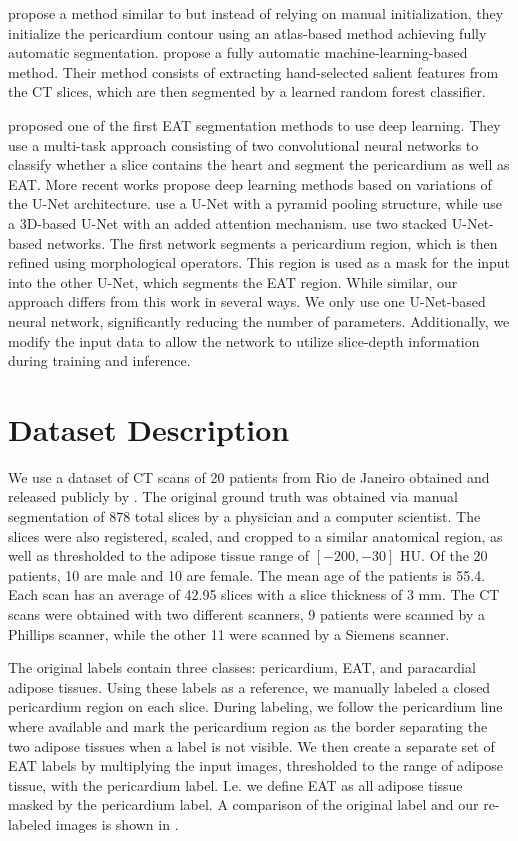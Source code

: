 \citet{Ding2014} propose a method similar to \citet{Coppini2010} but instead of relying on manual initialization, they initialize the pericardium contour using an atlas-based method achieving fully automatic segmentation. \citet{Rodrigues2016} propose a fully automatic machine-learning-based method. Their method consists of extracting hand-selected salient features from the CT slices, which are then segmented by a learned random forest classifier.

\citet{Commandeur2018} proposed one of the first EAT segmentation methods to use deep learning. They use a multi-task approach consisting of two convolutional neural networks to classify whether a slice contains the heart and segment the pericardium as well as EAT. More recent works propose deep learning methods based on variations of the U-Net architecture. \citet{Li2019} use a U-Net with a pyramid pooling structure, while \citet{he2020} use a 3D-based U-Net with an added attention mechanism. \citet{Zhang2020} use two stacked U-Net-based networks. The first network segments a pericardium region, which is then refined using morphological operators. This region is used as a mask for the input into the other U-Net, which segments the EAT region. While similar, our approach differs from this work in several ways. We only use one U-Net-based neural network, significantly reducing the number of parameters. Additionally, we modify the input data to allow the network to utilize slice-depth information during training and inference.

\section{Dataset Description}\label{data}

We use a dataset of CT scans of 20 patients from Rio de Janeiro obtained and released publicly by \citet{Rodrigues2016}. The original ground truth was obtained via manual segmentation of 878 total slices by a physician and a computer scientist. The slices were also registered, scaled, and cropped to a similar anatomical region, as well as thresholded to the adipose tissue range of $[-200, -30]$ HU. Of the 20 patients, 10 are male and 10 are female. The mean age of the patients is 55.4. Each scan has an average of 42.95 slices with a slice thickness of 3 mm. The CT scans were obtained with two different scanners, 9 patients were scanned by a Phillips scanner, while the other 11 were scanned by a Siemens scanner.

The original labels contain three classes: pericardium, EAT, and paracardial adipose tissues. Using these labels as a reference, we manually labeled a closed pericardium region on each slice. During labeling, we follow the pericardium line where available and mark the pericardium region as the border separating the two adipose tissues when a label is not visible. We then create a separate set of EAT labels by multiplying the input images, thresholded to the range of adipose tissue, with the pericardium label. I.e. we define EAT as all adipose tissue masked by the pericardium label. A comparison of the original label and our re-labeled images is shown in .

